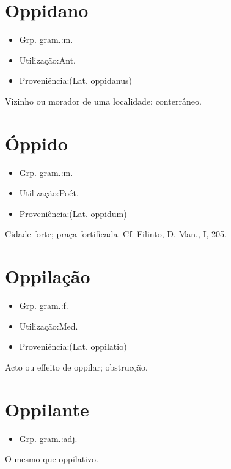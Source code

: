 \section{Oppidano}
\begin{itemize}
\item {Grp. gram.:m.}
\end{itemize}
\begin{itemize}
\item {Utilização:Ant.}
\end{itemize}
\begin{itemize}
\item {Proveniência:(Lat. \textunderscore oppidanus\textunderscore )}
\end{itemize}
Vizinho ou morador de uma localidade; conterrâneo.
\section{Óppido}
\begin{itemize}
\item {Grp. gram.:m.}
\end{itemize}
\begin{itemize}
\item {Utilização:Poét.}
\end{itemize}
\begin{itemize}
\item {Proveniência:(Lat. \textunderscore oppidum\textunderscore )}
\end{itemize}
Cidade forte; praça fortificada. Cf. Filinto, \textunderscore D. Man.\textunderscore , I, 205.
\section{Oppilação}
\begin{itemize}
\item {Grp. gram.:f.}
\end{itemize}
\begin{itemize}
\item {Utilização:Med.}
\end{itemize}
\begin{itemize}
\item {Proveniência:(Lat. \textunderscore oppilatio\textunderscore )}
\end{itemize}
Acto ou effeito de oppilar; obstrucção.
\section{Oppilante}
\begin{itemize}
\item {Grp. gram.:adj.}
\end{itemize}
O mesmo que \textunderscore oppilativo\textunderscore .
